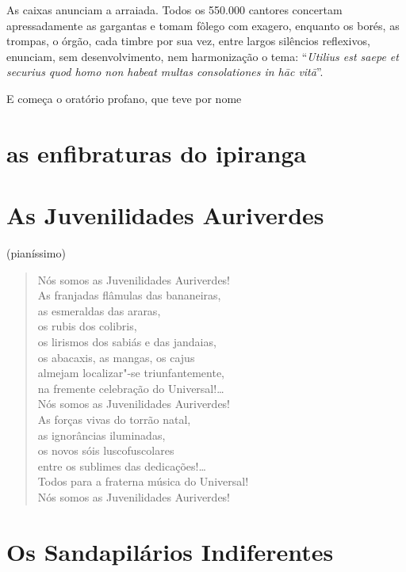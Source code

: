 As caixas anunciam a arraiada. Todos os 550.000 cantores concertam
apressadamente as gargantas e tomam fôlego com exagero, enquanto os
borés, as trompas, o órgão, cada timbre por sua vez, entre largos
silêncios reflexivos, enunciam, sem desenvolvimento, nem harmonização o
tema: ``\emph{Utilius est saepe et securius quod homo non habeat multas
consolationes in hāc vitā}''.

E começa o oratório profano, que teve por nome

\medskip
\section*{as enfibraturas do ipiranga}

\pagebreak

\section*{As Juvenilidades Auriverdes}

\hfill{}{\small(pianíssimo)}

\begin{verse}
Nós somos as Juvenilidades Auriverdes!\\
As franjadas flâmulas das bananeiras,\\
as esmeraldas das araras,\\
os rubis dos colibris,\\
os lirismos dos sabiás e das jandaias,\\
os abacaxis, as mangas, os cajus\\
almejam localizar"-se triunfantemente,\\
na fremente celebração do Universal!\ldots{}\\
Nós somos as Juvenilidades Auriverdes!\\
As forças vivas do torrão natal,\\
as ignorâncias iluminadas,\\
os novos sóis luscofuscolares\\
entre os sublimes das dedicações!\ldots{}\\
Todos para a fraterna música do Universal!\\
Nós somos as Juvenilidades Auriverdes!
\end{verse}

\medskip
\section*{Os Sandapilários Indiferentes}

